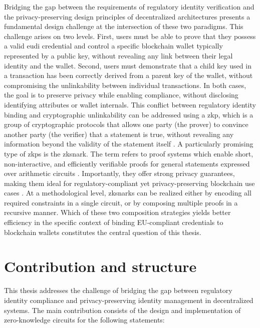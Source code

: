 Bridging the gap between the requirements of regulatory identity verification and the privacy-preserving design principles of decentralized architectures presents a fundamental design challenge at the intersection of these two paradigms. This challenge arises on two levels. First, users must be able to prove that they possess a valid \acrshort{eudi} credential and control a specific blockchain wallet typically represented by a public key, without revealing any link between their legal identity and the wallet. Second, users must demonstrate that a child key used in a transaction has been correctly derived from a parent key of the wallet, without compromising the unlinkability between individual transactions. In both cases, the goal is to preserve privacy while enabling compliance, without disclosing identifying attributes or wallet internals. This conflict between regulatory identity binding and cryptographic unlinkability can be addressed using a \acrfull{zkp}, which is a group of cryptographic protocols that allows one party (the prover) to convince another party (the verifier) that a statement is true, without revealing any information beyond the validity of the statement itself \cite{narayanan2016bitcoin, 10.1145/22145.22178}. A particularly promising type of \acrshort{zkp}s is the \acrfull{zksnark}. The term refers to proof systems which enable short, non-interactive, and efficiently verifiable proofs for general statements expressed over arithmetic circuits \cite{liang2025}. Importantly, they offer strong privacy guarantees, making them ideal for regulatory-compliant yet privacy-preserving blockchain use cases \cite{rosenberg2023, Baldimtsi_2024}. At a methodological level, \acrshort{zksnark}s can be realized either by encoding all required constraints in a single circuit, or by composing multiple proofs in a recursive manner. Which of these two composition strategies yields better efficiency in the specific context of binding EU-compliant credentials to blockchain wallets constitutes the central question of this thesis.

\section{Contribution and structure}
\label{sec:contribution-structure}
This thesis addresses the challenge of bridging the gap between regulatory identity compliance and privacy-preserving identity management in decentralized systems. The main contribution consists of the design and implementation of zero-knowledge circuits for the following statements:

